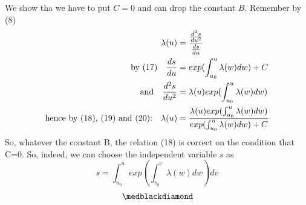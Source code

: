 We show tha we have to put $C=0$ and can drop the constant $B$. Remember by (8)
\begin{align}
\lambda (u) &= \frac{\dv[2]{s}{u}}{\dv{s}{u}}\\
\text{by (17)} \quad \dv{s}{u}  &=exp(\int^u_{u_0} \lambda (w)dw) +C\\
\text{and}\quad \dv[2]{s}{u}  &= \lambda (u) exp(\int^u_{u_0} \lambda (w)dw) \\
\text{hence by (18), (19) and (20):} \quad \lambda (u)&= \frac{\lambda (u) exp(\int^u_{u_0} \lambda (w)dw)}{exp(\int^u_{u_0} \lambda (w)dw) +C}
\end{align}
So, whatever the constant B, the relation (18) is correct on the condition that C=0. 
So, indeed, we can choose the independent variable $s$ as
$$s  =\int^u_{u_0}  exp(\int^v_{v_0} \lambda (w)dw)dv $$ 
$$\medblackdiamond$$
\newpage

